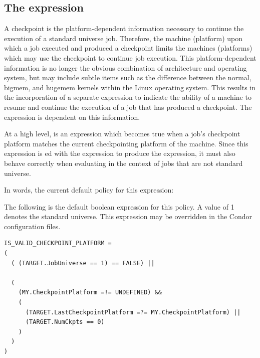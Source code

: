 \subsection{\label{sec:Is-Valid-Checkpoint-Platform}The  expression}

A checkpoint is the platform-dependent information necessary
to continue the execution of a standard universe job.
Therefore, the machine (platform) upon which a job executed
and produced a checkpoint limits the machines (platforms)
which may use the checkpoint to continue job execution.
This platform-dependent information is no longer
the obvious combination of architecture and operating system, 
but may include subtle items such as the 
difference between the normal, bigmem, and hugemem kernels
within the Linux operating system.
This results in the incorporation of a separate
expression to indicate the ability of a machine to
resume and continue the execution of a job that has produced
a checkpoint.
The  expression is dependent on this information.

At a high level,  is an expression
which becomes true when a job's checkpoint platform matches the
current checkpointing platform of the machine. 
Since this expression is ed with the  expression
to produce the  expression,
it must also behave correctly when evaluating in the context of jobs
that are not standard universe.

In words,
the current default policy for this expression:


The following  is the default boolean expression for this
policy.
A  value of 1 denotes the standard universe.
This expression  may be
overridden in the Condor configuration files.

\footnotesize
\begin{verbatim}
IS_VALID_CHECKPOINT_PLATFORM = 
(
  ( (TARGET.JobUniverse == 1) == FALSE) ||

  (
    (MY.CheckpointPlatform =!= UNDEFINED) &&
    (
      (TARGET.LastCheckpointPlatform =?= MY.CheckpointPlatform) ||
      (TARGET.NumCkpts == 0)
    )
  )
)
\end{verbatim}
\normalsize

